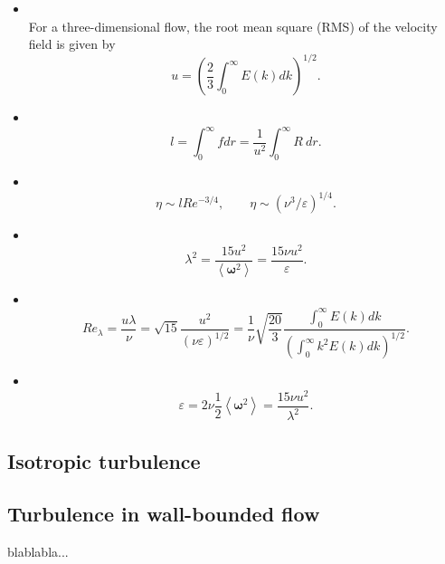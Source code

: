 \begin{itemize}
\item{}\\ For a three-dimensional flow, the root mean square (RMS) of the velocity field is given by
$$u=\left(\frac{2}{3}\int_0^\infty E(k)dk\right)^{1/2}.$$
\item{}\\ $$l=\int_0^\infty fdr=\frac{1}{u^2}\int_0^\infty R\ dr.$$
\item{}\\$$\eta\sim lRe^{-3/4},\quad\quad\eta\sim\left(\nu^3/\varepsilon\right)^{1/4}.$$
\item{}\\$$\lambda^2=\frac{15u^2}{\left\langle\boldsymbol{\omega}^2\right\rangle}=\frac{15\nu u^2}{\varepsilon}.$$
\item{}\\$$Re_\lambda=\frac{u\lambda}{\nu}=\sqrt{15}\frac{u^2}{\left(\nu\varepsilon\right)^{1/2}}=\frac{1}{\nu}\sqrt{\frac{20}{3}}\frac{\int_0^\infty E(k)dk}{\left(\int_0^\infty k^2E(k)dk\right)^{1/2}}.$$
\item{}\\$$\varepsilon=2\nu\frac{1}{2}\left\langle\boldsymbol{\omega}^2\right\rangle=\frac{15\nu u^2}{\lambda^2}.$$
\end{itemize}

\subsection{Isotropic turbulence}

\subsection{Turbulence in wall-bounded flow}

blablabla...
